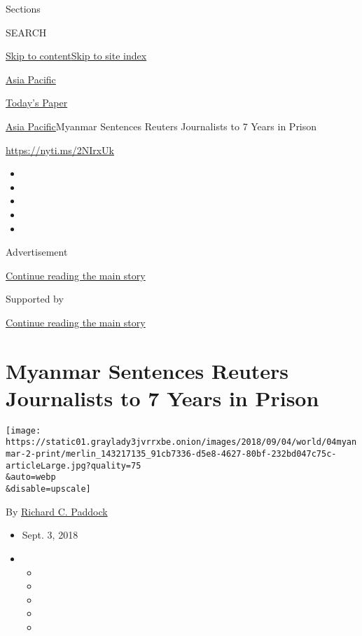 Sections

SEARCH

\protect\hyperlink{site-content}{Skip to
content}\protect\hyperlink{site-index}{Skip to site index}

\href{https://www.nytimes3xbfgragh.onion/section/world/asia}{Asia
Pacific}

\href{https://myaccount.nytimes3xbfgragh.onion/auth/login?response_type=cookie\&client_id=vi}{}

\href{https://www.nytimes3xbfgragh.onion/section/todayspaper}{Today's
Paper}

\href{/section/world/asia}{Asia Pacific}\textbar{}Myanmar Sentences
Reuters Journalists to 7 Years in Prison

\url{https://nyti.ms/2NIrxUk}

\begin{itemize}
\item
\item
\item
\item
\item
\end{itemize}

Advertisement

\protect\hyperlink{after-top}{Continue reading the main story}

Supported by

\protect\hyperlink{after-sponsor}{Continue reading the main story}

\hypertarget{myanmar-sentences-reuters-journalists-to-7-years-in-prison}{%
\section{Myanmar Sentences Reuters Journalists to 7 Years in
Prison}\label{myanmar-sentences-reuters-journalists-to-7-years-in-prison}}

\texttt{[image: https://static01.graylady3jvrrxbe.onion/images/2018/09/04/world/04myanmar-2-print/merlin\_143217135\_91cb7336-d5e8-4627-80bf-232bd047c75c-articleLarge.jpg?quality=75\\\&auto=webp\\\&disable=upscale]}

By
\href{https://www.nytimes3xbfgragh.onion/by/richard-c-paddock}{Richard
C. Paddock}

\begin{itemize}
\item
  Sept. 3, 2018
\item
  \begin{itemize}
  \item
  \item
  \item
  \item
  \item
  \end{itemize}
\end{itemize}

